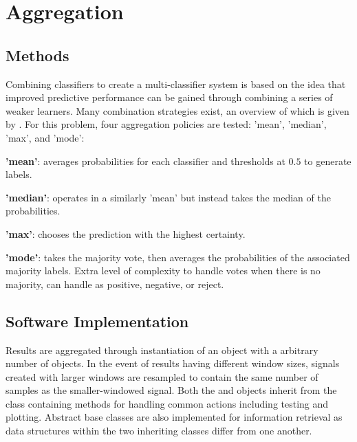 \section{Aggregation}
\label{sec:pl-agg}
    
    \subsection{Methods}
    \label{subsec:pl-agg-methods}
        Combining classifiers to create a multi-classifier system is based on the idea that improved predictive performance can be gained through combining a series of weaker learners. Many combination strategies exist, an overview of which is given by \textcite{Suen2000}. For this problem, four aggregation policies are tested: 'mean', 'median', 'max', and 'mode':
        \begin{sitemize}
            \item\textbf{'mean'}: averages probabilities for each classifier and thresholds at $0.5$ to generate labels. 
            \item\textbf{'median'}: operates in a similarly 'mean' but instead takes the median of the probabilities. 
            \item\textbf{'max'}: chooses the prediction with the highest certainty.
            \item\textbf{'mode'}: takes the majority vote, then averages the probabilities of the associated majority labels. Extra level of complexity to handle votes when there is no majority, can handle as positive, negative, or reject.
        \end{sitemize}
        
    \subsection{Software Implementation}
    \label{subsec:pl-agg-software}
        Results are aggregated through instantiation of an  object with a arbitrary number of  objects. In the event of results having different window sizes, signals created with larger windows are resampled to contain the same number of samples as the smaller-windowed signal. Both the  and  objects inherit from the  class containing methods for handling common actions including testing and plotting. Abstract base classes are also implemented for information retrieval as data structures within the two inheriting classes differ from one another.